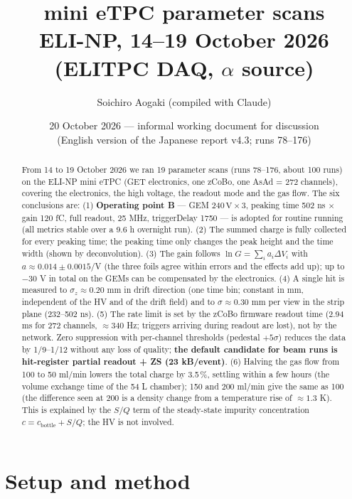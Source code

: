 \documentclass[a4paper,11pt]{article}
\title{mini eTPC parameter scans\\[2pt]
\large ELI-NP, 14--19 October 2026 (ELITPC DAQ, $\alpha$ source)}
\author{Soichiro Aogaki (compiled with Claude)}
\date{20 October 2026 --- informal working document for discussion\\
\small (English version of the Japanese report v4.3; runs 78--176)}
\begin{document}
\maketitle

\begin{abstract}
From 14 to 19 October 2026 we ran 19 parameter scans (runs 78--176, about 100 runs) on the ELI-NP mini eTPC
(GET electronics, one zCoBo, one AsAd = 272 channels), covering the electronics, the high voltage, the readout mode and the gas flow.
The six conclusions are:
(1) \textbf{Operating point B} --- GEM $240\,\mathrm{V} \times 3$, peaking time 502 ns $\times$ gain 120 fC, full readout, 25 MHz, triggerDelay 1750 --- is adopted for routine running (all metrics stable over a 9.6 h overnight run).
(2) The summed charge is fully collected for every peaking time; the peaking time only changes the peak height and the time width (shown by deconvolution).
(3) The gain follows $\ln G = \sum_i a_i \Delta V_i$ with $a \approx 0.014 \pm 0.0015$/V (the three foils agree within errors and the effects add up); up to $-30$ V in total on the GEMs can be compensated by the electronics.
(4) A single hit is measured to $\sigma_z \approx 0.20$ mm in drift direction (one time bin; constant in mm, independent of the HV and of the drift field) and to $\sigma \approx 0.30$ mm per view in the strip plane (232--502 ns).
(5) The rate limit is set by the zCoBo firmware readout time (2.94 ms for 272 channels, $\approx 340$ Hz; triggers arriving during readout are lost), not by the network. Zero suppression with per-channel thresholds (pedestal $+5\sigma$) reduces the data by 1/9--1/12 without any loss of quality; \textbf{the default candidate for beam runs is hit-register partial readout + ZS (23 kB/event)}.
(6) Halving the gas flow from 100 to 50 ml/min lowers the total charge by 3.5\,\%, settling within a few hours (the volume exchange time of the 54 L chamber); 150 and 200 ml/min give the same as 100 (the difference seen at 200 is a density change from a temperature rise of $\approx 1.3$ K). This is explained by the $S/Q$ term of the steady-state impurity concentration $c = c_\mathrm{bottle} + S/Q$; the HV is not involved.
\end{abstract}

\tableofcontents

\section{Setup and method}
\end{document}
